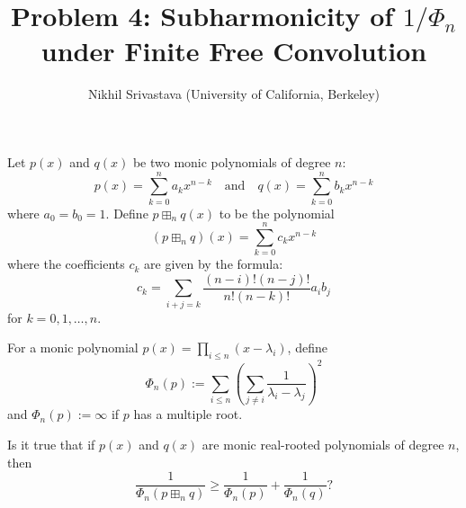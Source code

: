 

\title{Problem 4: Subharmonicity of $1/\Phi_n$ under Finite Free Convolution}
\author{Nikhil Srivastava (University of California, Berkeley)}
\date{}


\maketitle

Let $p(x)$ and $q(x)$ be two monic polynomials of degree $n$:
\[
p(x) = \sum_{k=0}^n a_k x^{n-k} \quad \text{and} \quad q(x) = \sum_{k=0}^n b_k x^{n-k}
\]
where $a_0 = b_0 = 1$. Define $p \boxplus_n q(x)$ to be the polynomial
\[
(p \boxplus_n q)(x) = \sum_{k=0}^n c_k x^{n-k}
\]
where the coefficients $c_k$ are given by the formula:
\[
c_k = \sum_{i+j=k} \frac{(n-i)! (n-j)!}{n! (n-k)!} a_i b_j
\]
for $k = 0, 1, \dots, n$.

For a monic polynomial $p(x)=\prod_{i\le n}(x- \lambda_i)$, define
$$\Phi_n(p):=\sum_{i\le n}\left(\sum_{j\neq i} \frac{1}{\lambda_i-\lambda_j}\right)^2$$
and $\Phi_n(p):=\infty$ if $p$ has a multiple root.

Is it true that if $p(x)$ and $q(x)$ are monic real-rooted polynomials of degree $n$, then
$$\frac{1}{\Phi_n(p\boxplus_n q)} \ge \frac{1}{\Phi_n(p)}+\frac{1}{\Phi_n(q)}?$$


